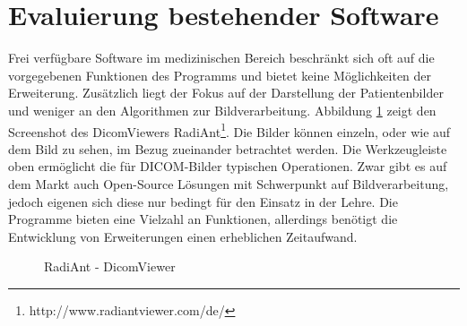 

\FloatBarrier
\section{Evaluierung bestehender Software}

Frei verfügbare Software im medizinischen Bereich beschränkt sich oft auf die vorgegebenen Funktionen des Programms und bietet keine Möglichkeiten der Erweiterung. Zusätzlich liegt der Fokus auf der Darstellung der Patientenbilder und weniger an den Algorithmen zur Bildverarbeitung. Abbildung \ref{radiant} zeigt den Screenshot des DicomViewers RadiAnt\footnote{http://www.radiantviewer.com/de/}. Die Bilder können einzeln, oder wie auf dem Bild zu sehen, im Bezug zueinander betrachtet werden. Die Werkzeugleiste oben ermöglicht die für DICOM-Bilder typischen Operationen.
Zwar gibt es auf dem Markt auch Open-Source Lösungen mit Schwerpunkt auf Bildverarbeitung, jedoch eigenen sich diese nur bedingt für den Einsatz in der Lehre. Die Programme bieten eine Vielzahl an Funktionen, allerdings benötigt die Entwicklung von Erweiterungen einen erheblichen Zeitaufwand.
 
\begin{figure}[htbp]
  \vspace{0.5cm}
  \centering
   \caption{RadiAnt - DicomViewer}
  \label{radiant}
  \vspace{0.5cm}
\end{figure}


